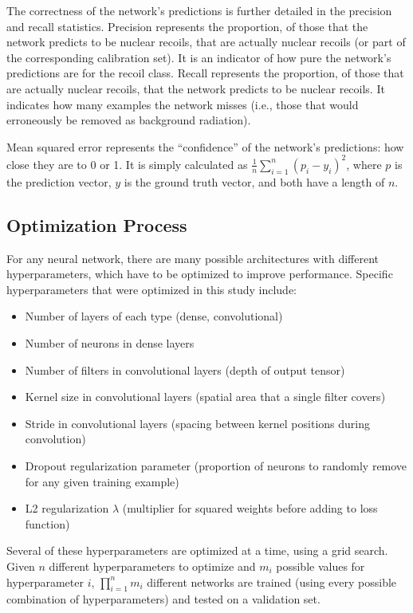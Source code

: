 \documentclass[10pt]{article}
\begin{document}
The correctness of the network's predictions is further detailed in the precision and recall statistics. Precision represents the proportion, of those that the network predicts to be nuclear recoils, that are actually nuclear recoils (or part of the corresponding calibration set). It is an indicator of how pure the network's predictions are for the recoil class. Recall represents the proportion, of those that are actually nuclear recoils, that the network predicts to be nuclear recoils. It indicates how many examples the network misses (i.e., those that would erroneously be removed as background radiation).

Mean squared error represents the ``confidence'' of the network's predictions: how close they are to 0 or 1. It is simply calculated as $\frac{1}{n} \sum _{i=1} ^n (p_i - y_i)^2$, where $p$ is the prediction vector, $y$ is the ground truth vector, and both have a length of $n$.

\subsection{Optimization Process} \label{optimization}

For any neural network, there are many possible architectures with different hyperparameters, which have to be optimized to improve performance. Specific hyperparameters that were optimized in this study include:

\begin{itemize}
    \item Number of layers of each type (dense, convolutional)
    \item Number of neurons in dense layers
    \item Number of filters in convolutional layers (depth of output tensor)
    \item Kernel size in convolutional layers (spatial area that a single filter covers)
    \item Stride in convolutional layers (spacing between kernel positions during convolution)
    \item Dropout regularization parameter (proportion of neurons to randomly remove for any given training example)
    \item L2 regularization $\lambda$ (multiplier for squared weights before adding to loss function)
\end{itemize}

Several of these hyperparameters are optimized at a time, using a grid search. Given $n$ different hyperparameters to optimize and $m_i$ possible values for hyperparameter $i$, $\prod _{i=1} ^n m_i$ different networks are trained (using every possible combination of hyperparameters) and tested on a validation set.
\end{document}
